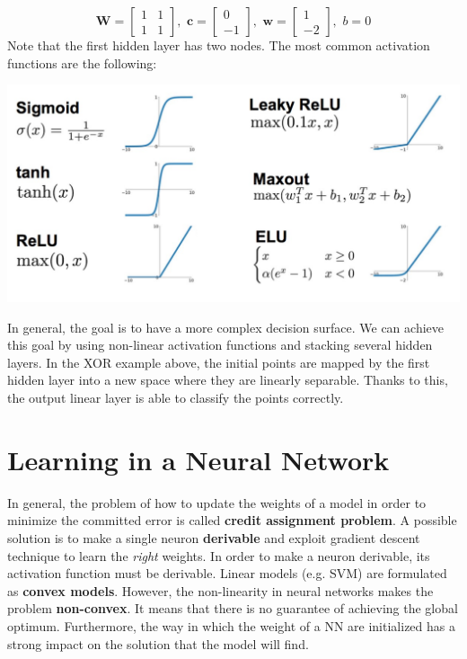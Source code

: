 \[
    \textbf{W} =
    \begin{bmatrix}
        1 & 1\\
        1 & 1
    \end{bmatrix},
    \,\,
    \textbf{c} = 
    \begin{bmatrix}
        0 \\
        -1
    \end{bmatrix},
    \,\,
    \textbf{w} = 
    \begin{bmatrix}
        1 \\
        -2
    \end{bmatrix},
    \,\,
    b = 0
\]
Note that the first hidden layer has two nodes.\newline\newline
The most common activation functions are the following:
\begin{center}
    \includegraphics[scale = 0.6]{images/Activation Functions.png}
\end{center}
In general, the goal is to have a more complex decision surface. We can achieve this goal by using non-linear activation functions and stacking several hidden layers. In the XOR example above, the initial points are mapped by the first hidden layer into a new space where they are linearly separable. Thanks to this, the output linear layer is able to classify the points correctly.

\section{Learning in a Neural Network}
In general, the problem of how to update the weights of a model in order to minimize the committed error is called \textbf{credit assignment problem}. A possible solution is to make a single neuron \textbf{derivable} and exploit gradient descent technique to learn the \textit{right} weights. In order to make a neuron derivable, its activation function must be derivable.\newline\newline
Linear models (e.g. SVM) are formulated as \textbf{convex models}. However, the non-linearity in neural networks makes the problem \textbf{non-convex}. It means that there is no guarantee of achieving the global optimum. Furthermore, the way in which the weight of a NN are initialized has a strong impact on the solution that the model will find.

